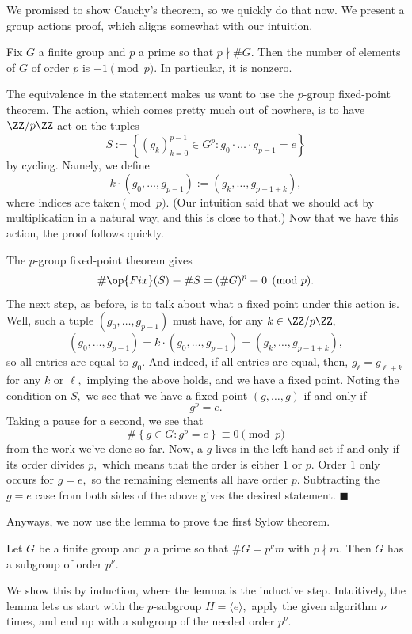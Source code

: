 We promised to show Cauchy's theorem, so we quickly do that now. We present a group actions proof, which aligns somewhat with our intuition.
\begin{theorem}
    Fix $G$ a finite group and $p$ a prime so that $p\nmid\#G.$ Then the number of elements of $G$ of order $p$ is $-1\pmod p.$ In particular, it is nonzero.
\end{theorem}
The equivalence in the statement makes us want to use the $p$-group fixed-point theorem. The action, which comes pretty much out of nowhere, is to have $\ZZ/p\ZZ$ act on the tuples
\[S:=\left\{(g_k)_{k=0}^{p-1}\in G^p:g_0\cdot\ldots\cdot g_{p-1}=e\right\}\]
by cycling. Namely, we define
\[k\cdot(g_0,\ldots,g_{p-1}):=(g_k,\ldots,g_{p-1+k}),\]
where indices are taken$\pmod p.$ (Our intuition said that we should act by multiplication in a natural way, and this is close to that.) Now that we have this action, the proof follows quickly.

The $p$-group fixed-point theorem gives
\[\#\op{Fix}(S)\equiv\#S=(\#G)^p\equiv0\pmod p.\]
The next step, as before, is to talk about what a fixed point under this action is. Well, such a tuple $(g_0,\ldots,g_{p-1})$ must have, for any $k\in\ZZ/p\ZZ,$
\[(g_0,\ldots,g_{p-1})=k\cdot(g_0,\ldots,g_{p-1})=(g_k,\ldots,g_{p-1+k}),\]
so all entries are equal to $g_0.$ And indeed, if all entries are equal, then, $g_\ell=g_{\ell+k}$ for any $k$ or $\ell,$ implying the above holds, and we have a fixed point. Noting the condition on $S,$ we see that we have a fixed point $(g,\ldots,g)$ if and only if
\[g^p=e.\]
Taking a pause for a second, we see that
\[\#\left\{g\in G:g^p=e\right\}\equiv0\pmod p\]
from the work we've done so far. Now, a $g$ lives in the left-hand set if and only if its order divides $p,$ which means that the order is either $1$ or $p.$ Order $1$ only occurs for $g=e,$ so the remaining elements all have order $p.$ Subtracting the $g=e$ case from both sides of the above gives the desired statement. $\blacksquare$

Anyways, we now use the lemma to prove the first Sylow theorem.
\begin{theorem}
    Let $G$ be a finite group and $p$ a prime so that $\#G=p^\nu m$ with $p\nmid m.$ Then $G$ has a subgroup of order $p^\nu.$
\end{theorem}
We show this by induction, where the lemma is the inductive step. Intuitively, the lemma lets us start with the $p$-subgroup $H=\langle e\rangle,$ apply the given algorithm $\nu$ times, and end up with a subgroup of the needed order $p^\nu.$

